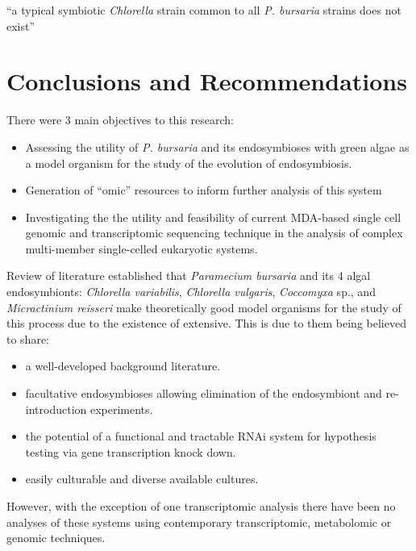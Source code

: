 \graphicspath{{chapters/7.Discussion/figures}}

\begin{savequote}[75mm]
    ``a typical symbiotic \textit{Chlorella} strain common to all \textit{P. bursaria}
    strains does not exist''
\end{savequote}

\chapter{Conclusions and Recommendations}

There were 3 main objectives to this research:
\begin{itemize}
    \item Assessing the utility
of \textit{P. bursaria} and its endosymbioses with green algae
as a model organism for the study of the evolution of endosymbiosis.
    \item Generation of ``omic'' resources to inform further analysis of this system
    \item Investigating the the utility and feasibility 
            of current MDA-based
            single cell genomic and transcriptomic sequencing technique in the 
            analysis of complex multi-member single-celled eukaryotic systems.
\end{itemize}


Review of literature established that \textit{Paramecium bursaria} and its
4 algal endosymbionts: \textit{Chlorella variabilis}, \textit{Chlorella vulgaris},
\textit{Coccomyxa} sp., 
and \textit{Micractinium reisseri} make theoretically good model
organisms for the study of this process due to the existence
of extensive.   This is due to them being believed to share:
\begin{itemize}
    \item a well-developed background literature.
    \item facultative endosymbioses allowing elimination of the endosymbiont
        and re-introduction experiments.
    \item the potential of a functional and tractable RNAi system for hypothesis
        testing via gene transcription knock down.
    \item easily culturable and diverse available cultures.
\end{itemize}
However, with the exception of one transcriptomic analysis \citep{Kodama2014} 
there have been no analyses of these systems using 
contemporary transcriptomic, metabolomic or genomic techniques. 



